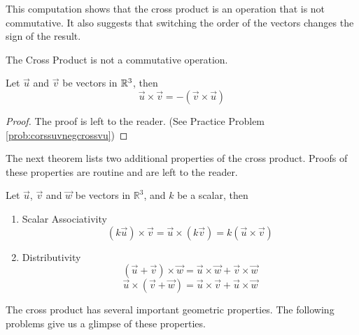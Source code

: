 \documentclass{ximera}
\begin{document}
\begin{exploration}
This computation shows that the cross product is an operation that is not commutative. It also suggests that switching the order of the vectors changes the sign of the result.
\end{exploration}

\begin{warning}The Cross Product is not a commutative operation.
\end{warning}

\begin{theorem}\label{th:corssuvnegcrossvu}
Let $\vec{u}$ and $\vec{v}$ be vectors in $\mathbb{R}^3$, then
$$\vec{u}\times\vec{v}=-(\vec{v}\times\vec{u})$$
\end{theorem}
\begin{proof}
The proof is left to the reader.  (See Practice Problem \ref{prob:corssuvnegcrossvu})
\end{proof}
The next theorem lists two additional properties of the cross product.  Proofs of these properties are routine and are left to the reader.  %

\begin{theorem}\label{th:crossproductproperties}
Let $\vec{u}$, $\vec{v}$ and $\vec{w}$ be vectors in $\mathbb{R}^3$, and $k$ be a scalar, then\\
\begin{enumerate}
\item\label{item:scalarassocofcrossprod} Scalar Associativity
$$(k\vec{u})\times \vec{v}=\vec{u}\times (k\vec{v})=k(\vec{u}\times \vec{v})$$
\item\label{item:distofrossprod} Distributivity
$$(\vec{u}+\vec{v})\times \vec{w}=\vec{u}\times \vec{w}+\vec{v}\times \vec{w}$$
$$\vec{u}\times (\vec{v}+\vec{w})=\vec{u}\times \vec{v}+\vec{u}\times \vec{w}$$
\end{enumerate}
\end{theorem}

The cross product has several important geometric properties. The following problems give us a glimpse of these properties.
\end{document}
